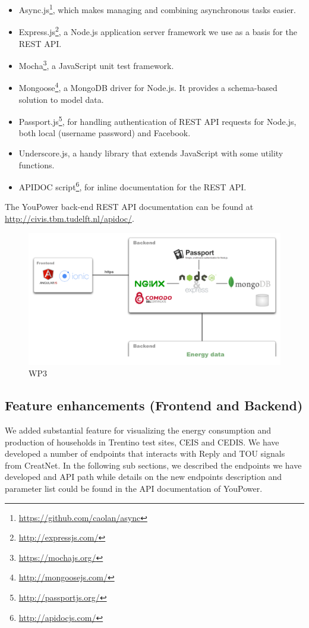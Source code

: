 \begin{itemize}
\item Async.js\footnote{\url{https://github.com/caolan/async}}, which makes managing and combining asynchronous tasks easier. 
\item Express.js\footnote{\url{http://expressjs.com/}}, a Node.js application server framework we use as a basis for the REST API. 
\item Mocha\footnote{\url{https://mochajs.org/}}, a JavaScript unit test framework. 
\item Mongoose\footnote{\url{http://mongoosejs.com/}}, a MongoDB driver for Node.js. It provides a schema-based solution to model data. 
\item Passport.js\footnote{\url{http://passportjs.org/}}, for handling authentication of REST API requests for Node.js, both local (username password) and Facebook. 
\item Underscore.js, a handy library that extends JavaScript with some utility functions. 
\item APIDOC script\footnote{\url{http://apidocjs.com/}}, for inline documentation for the REST API. 
\end{itemize}

The YouPower back-end REST API documentation can be found at {\footnotesize\url{http://civis.tbm.tudelft.nl/apidoc/}}. 
% 


\begin{figure}
\centering
\includegraphics[width=0.9\linewidth]{img/tech}
\caption{WP3}
\label{fig:ScreenShot2015-11-09at18}
\end{figure}

\subsection{Feature enhancements (Frontend and Backend)}
We added substantial feature for visualizing the energy consumption and production of households in Trentino test sites, CEIS and CEDIS. We have developed a number of endpoints that interacts with Reply and  TOU signals from CreatNet. In the following sub sections, we described the endpoints we have developed and API path while details on the new endpoints description and parameter list could be found in the API documentation of YouPower.

